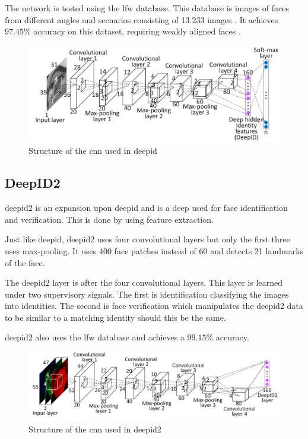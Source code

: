 The network is tested using the \gls{lfw} database. This database is images of faces from different angles and scenarios consisting of 13.233 images \citep{lfw2007}. It achieves $97.45\%$ accuracy on this dataset, requiring weakly aligned faces \citep{deepID2014}.

\begin{figure}[h]
	\centering
	\includegraphics[width=\textwidth]{figures/deepid_convnet}
	\caption{Structure of the \gls{cnn} used in \gls{deepid} \citep{deepID2014}}
	\label{fig:deepid_convnet}
\end{figure}

\subsection{DeepID2}
\gls{deepid2} is an expansion upon \gls{deepid} and is a deep  used for face identification and verification. This is done by using feature extraction.

Just like \gls{deepid}, \gls{deepid2} uses four convolutional layers but only the first three uses max-pooling. It uses 400 face patches instead of 60 \citep{deepID2014,sun2014} and detects 21 landmarks of the face.

The \gls{deepid2} layer is after the four convolutional layers. This layer is learned under two supervisory signals. The first is identification classifying the images into identities. The second is face verification which manipulates the \gls{deepid2} data to be similar to a matching identity should this be the same.

\gls{deepid2} also uses the \gls{lfw} database and achieves a $99.15\%$ accuracy.

\begin{figure}[h]
	\centering
	\includegraphics[width=\textwidth]{figures/deepid2_convnet}
	\caption{Structure of the \gls{cnn} used in \gls{deepid2} \citep{sun2014}}
	\label{fig:deepid2_convnet}
\end{figure}

